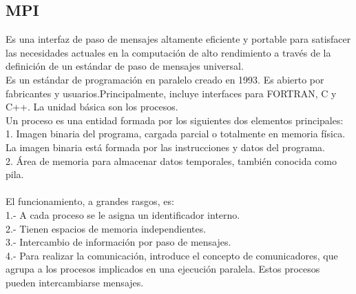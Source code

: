\documentclass[12pt]{article}
\begin{document}
\begin{titlepage}
\vspace{30pt} %


\section*{MPI}
Es una interfaz de paso de mensajes altamente eficiente y portable para satisfacer las necesidades actuales en la computación de alto rendimiento a través de la definición de un estándar de paso de mensajes universal.\\
Es un estándar de programación en paralelo creado en 1993. Es abierto por fabricantes y usuarios.Principalmente, incluye interfaces para FORTRAN, C y C++.
La unidad básica son los procesos.\\ 
Un proceso es una entidad formada por los siguientes dos elementos principales:\\
1. Imagen binaria del programa, cargada parcial o totalmente en memoria física. La imagen
binaria está formada por las instrucciones y datos del programa.\\
2. Área de memoria para almacenar datos temporales, también conocida como pila.\\
 \\
El funcionamiento, a grandes rasgos, es:\\
1.- A cada proceso se le asigna un identificador interno.\\
2.- Tienen espacios de memoria independientes.\\
3.- Intercambio de información por paso de mensajes.\\
4.- Para realizar la comunicación, introduce el concepto de comunicadores, que agrupa a los procesos implicados en una ejecución paralela. Estos procesos pueden intercambiarse
mensajes.\\


\end{titlepage}
\end{document}
